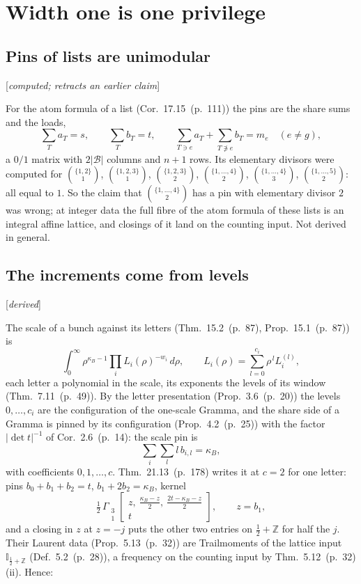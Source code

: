 \documentclass[11pt]{article}
\newcommand{\cB}{\mathcal B}
\newcommand{\Gst}[4]{\Gamma_{\substack{#1\\#2}}\!\begin{bmatrix}#3\\#4\end{bmatrix}}
\newcommand{\Ilat}[1]{\mathbb I_{#1}}
\newcommand{\status}[1]{\hfill{\small[\textit{#1}]}}
\newcommand{\hb}[2]{#1~(p.~#2)}   %
\theoremstyle{plain}
\theoremstyle{remark}
\begin{document}
\section{Width one is one privilege}

\subsection{Pins of lists are unimodular}\status{computed; retracts an earlier claim}

For the atom formula of a list (Cor.~\hb{17.15}{111}) the pins are the share sums and the loads,
\[
\sum_Ta_T=s,\qquad\sum_Tb_T=t,\qquad\sum_{T\ni e}a_T+\sum_{T\not\ni e}b_T=m_e\quad(e\neq g),
\]
a $0/1$ matrix with $2|\cB|$ columns and $n+1$ rows. Its elementary divisors were computed for $\binom{\{1,2\}}1$, $\binom{\{1,2,3\}}1$, $\binom{\{1,2,3\}}2$, $\binom{\{1,\dots,4\}}2$, $\binom{\{1,\dots,4\}}3$, $\binom{\{1,\dots,5\}}2$: all equal to $1$. So the claim that $\binom{\{1,\dots,4\}}2$ has a pin with elementary divisor $2$ was wrong; at integer data the full fibre of the atom formula of these lists is an integral affine lattice, and closings of it land on the counting input. Not derived in general.

\subsection{The increments come from levels}\status{derived}

The scale of a bunch against its letters (Thm.~\hb{15.2}{87}, Prop.~\hb{15.1}{87}) is
\[
\int_0^\infty\rho^{\kappa_B-1}\prod_iL_i(\rho)^{-w_i}\,d\rho,\qquad L_i(\rho)=\sum_{l=0}^{c_i}\rho^{\,l}L^{(l)}_i,
\]
each letter a polynomial in the scale, its exponents the levels of its window (Thm.~\hb{7.11}{49}). By the letter presentation (Prop.~\hb{3.6}{20}) the levels $0,\dots,c_i$ are the configuration of the one-scale Gramma, and the share side of a Gramma is pinned by its configuration (Prop.~\hb{4.2}{25}) with the factor $|\det t|^{-1}$ of Cor.~\hb{2.6}{14}: the scale pin is
\[
\sum_i\sum_l l\,b_{i,l}=\kappa_B,
\]
with coefficients $0,1,\dots,c$. Thm.~\hb{21.13}{178} writes it at $c=2$ for one letter: pins $b_0+b_1+b_2=t$, $b_1+2b_2=\kappa_B$, kernel
\[
\tfrac12\,\Gst31{z,\ \tfrac{\kappa_B-z}2,\ \tfrac{2t-\kappa_B-z}2}{t},\qquad z=b_1,
\]
and a closing in $z$ at $z=-j$ puts the other two entries on $\frac12+\mathbb Z$ for half the $j$. Their Laurent data (Prop.~\hb{5.13}{32}) are Trailmoments of the lattice input $\Ilat{\frac12+\mathbb Z}$ (Def.~\hb{5.2}{28}), a frequency on the counting input by Thm.~\hb{5.12}{32}(ii). Hence:
\end{document}
